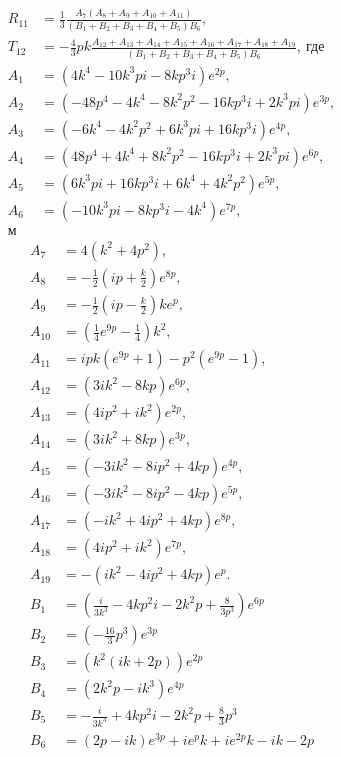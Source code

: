 \documentclass[a4 paper, 12 pt]{extarticle}
\begin{document}
   \[
   \begin{aligned}
   R_{11} &= \frac{1}{3}{\frac { A_7  \left( A_8+A_9+ A_{10}+A_{11}  \right) }{ \left( 
   		B_1+B_2+B_3+ B_4+B_5 \right) B_6 }}, \\
   T_{12} &= -\frac{4}{3}pk{\frac {A_{12} + A_{13} + A_{14} + A_{15} + A_{16} + A_{17} + A_{18} + A_{19}}{ \left(B_1+B_2+B_3+ B_4+B_5 \right) B_6 }}, \ \text{где}\\
   A_1 &= \left(4k^4 -10k^3pi - 8kp^3i\right)e^{2p}, \\
   A_2 &= \left(-48p^4 -4k^4 -8k^2p^2-16kp^3i+2k^3pi\right)e^{3p}, \\
   A_3 &= \left(-6k^4-4k^2p^2+6k^3pi+16kp^3i\right)e^{4p},\\
   A_4 &= \left(48p^4+4k^4+8k^2p^2-16kp^3i+2k^3pi\right)e^{6p},\\
   A_5 &= \left(6k^3pi+16kp^3i+6k^4+4k^2p^2\right)e^{5p},\\
   A_6 &= \left(-10k^3pi-8kp^3i-4k^4\right)e^{7p},\\м
   \end{aligned}\]
   \[
   \begin{aligned}
   A_7 &= 4\left(k^2+4p^2\right),\\
   A_8 &= -\frac{1}{2}\left(ip+\frac{k}{2}\right)e^{8p},\\
   A_9 &= -\frac{1}{2}\left(ip-\frac{k}{2}\right)ke^p,\\
   A_{10} &= \left(\frac{1}{4}e^{9p}-\frac{1}{4}\right)k^2,\\
   A_{11} &= ipk\left(e^{9p}+1\right)-p^2\left(e^{9p}-1\right),\\
   A_{12} &= \left(3ik^2-8kp\right)e^{6p},\\
   A_{13} &= \left(4ip^2+ik^2\right)e^{2p},\\
   A_{14} &= \left(3ik^2+8kp\right)e^{3p},\\
   A_{15} &= \left(-3ik^2-8ip^2+4kp\right)e^{4p},\\
   A_{16} &= \left(-3ik^2-8ip^2-4kp\right)e^{5p},\\
   A_{17} &= \left(-ik^2+4ip^2+4kp\right)e^{8p},\\
   A_{18} &= \left(4ip^2+ik^2\right)e^{7p},\\
   A_{19} &= -\left(ik^2-4ip^2+4kp\right)e^p.\\
   B_1 &=\left(\frac{i}{3k^3}-4kp^2i-2k^2p+\frac{8}{3p^3}\right)e^{6p}\\
   B_2 &=\left(-\frac{16}{3}p^3\right)e^{3p}\\
   B_3 &=\left(k^2\left(ik+2p\right)\right)e^{2p}\\
   B_4 &=\left(2k^2p-ik^3\right)e^{4p}\\
   B_5 &=-\frac{i}{3k^3}+4kp^2i-2k^2p+\frac{8}{3}p^3\\
   B_6 &=\left(2p-ik\right)e^{3p}+ie^pk+ie^{2p}k-ik-2p\\
   \end{aligned}\]
   
\end{document}
